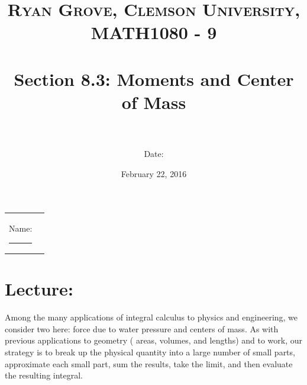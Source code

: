 \documentclass[paper=a4, fontsize=11pt]{scrartcl} %
\title{	
\normalfont \normalsize 
\textsc{Ryan Grove, Clemson University, MATH1080 - 9} \\ [25pt] %
\horrule{0.5pt} \\[0.4cm] %
\huge Section 8.3: Moments and Center of Mass \\ %
\horrule{2pt} \\[0.5cm] %
}
\author{Date:} %
\date{\normalsize February 22, 2016} %
\numberwithin{equation}{section} %
\numberwithin{figure}{section} %
\numberwithin{table}{section} %
\begin{document}
\maketitle %

\begin{flushleft}
\begin{tabular}{l l}
Name: \rule{3.2in}{.01cm}  & {}%
\end{tabular}
\end{flushleft}


\section*{\textbf{Lecture:}}
Among the many applications of integral calculus to physics and engineering, we consider two here: force due to water pressure and centers of mass. As with previous applications to geometry ( areas, volumes, and lengths) and to work, our strategy is to break up the physical quantity into a large number of small parts, approximate each small part, sum the results, take the limit, and then evaluate the resulting integral.\\
\indent
\end{document}
